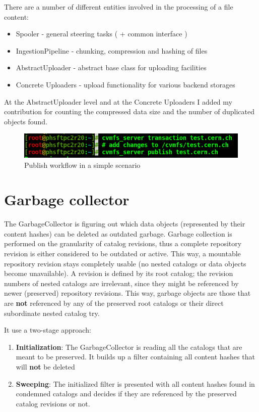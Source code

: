 \par 
\par
There are a number of different entities involved in the processing of a file content:
\begin{itemize}
\item Spooler            - general steering tasks ( + common interface )
\item IngestionPipeline  - chunking, compression and hashing of files
\item AbstractUploader   - abstract base class for uploading facilities
\item Concrete Uploaders - upload functionality for various backend storages
\end{itemize}

\par
At the AbstractUploader level and at the Concrete Uploaders I added my contribution for counting the compressed data size and the number of duplicated objects found.


\begin{figure}[h]
\centering
\includegraphics[scale=0.5]{figures/publish_terminal}
\caption{Publish workflow in a simple scenario}
\end{figure}

\section{Garbage collector}

\par The GarbageCollector is figuring out which data objects (represented by
their content hashes) can be deleted as outdated garbage.
Garbage collection is performed on the granularity of catalog revisions, thus
a complete repository revision is either considered to be outdated or active.
This way, a mountable repository revision stays completely usable (no nested
catalogs or data objects become unavailable). A revision is defined by its
root catalog; the revision numbers of nested catalogs are irrelevant, since
they might be referenced by newer (preserved) repository revisions.
This way, garbage objects are those that are \textbf{not} referenced by any of the preserved root catalogs or their direct subordinate nested catalog try.

It use a two-stage approach:
\begin{enumerate}
    \item \textbf{Initialization}:  The GarbageCollector is reading all the catalogs that are meant to be preserved. It builds up a filter containing all content hashes that will \textbf{not} be deleted
    \item \textbf{Sweeping}: The initialized filter is presented with all content hashes found in condemned catalogs and decides if they are referenced by the preserved catalog revisions or not.
\end{enumerate}

